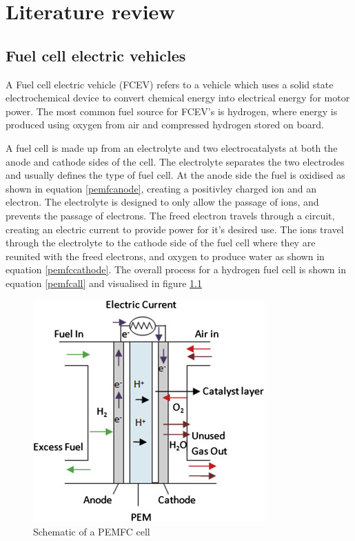 
\chapter{Literature review}

\section{Fuel cell electric vehicles}
A Fuel cell electric vehicle (FCEV) refers to a vehicle which uses a solid state electrochemical device to convert chemical energy into electrical energy for motor power. The most common fuel source for FCEV's is hydrogen, where energy is produced using oxygen from air and compressed hydrogen stored on board. 

A fuel cell is made up from an electrolyte and two electrocatalysts at both the anode and cathode sides of the cell. The electrolyte separates the two electrodes and usually defines the type of fuel cell. At the anode side the fuel is oxidised as shown in equation \ref{pemfcanode}, creating a positivley charged ion and an electron. The electrolyte is designed to only allow the passage of ions, and prevents the passage of electrons. The freed electron travels through a circuit, creating an electric current to provide power for it's desired use. The ions travel through the electrolyte to the cathode side of the fuel cell where they are reunited with the freed electrons, and oxygen to produce water as shown in equation \ref{pemfccathode}. The overall process for a hydrogen fuel cell is shown in equation \ref{pemfcall} and visualised in figure \ref{fig:pemfccell}

\begin{figure}[H]
    \centering
    \includegraphics{figures/pemfccell.jpg}
    \caption{Schematic of a PEMFC cell \cite{Dharmalingam2019}}
    \label{fig:pemfccell}
\end{figure}

